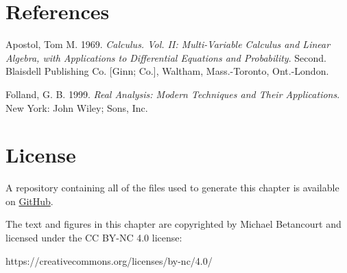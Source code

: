 \documentclass[
  letterpaper,
  DIV=11,
  numbers=noendperiod]{scrartcl}
\newlength{\cslhangindent}
\newlength{\cslentryspacingunit} %
\newenvironment{CSLReferences}[2] %
 {%
  \setlength{\parindent}{0pt}
  \ifodd #1
  \let\oldpar\par
  \def\par{\hangindent=\cslhangindent\oldpar}
  \fi
  \setlength{\parskip}{#2\cslentryspacingunit}
 }%
 {}
\begin{document}
\hypertarget{references}{%
\section*{References}\label{references}}

\hypertarget{refs}{}
\begin{CSLReferences}{1}{0}
\leavevmode{}%
Apostol, Tom M. 1969. \emph{Calculus. {V}ol. {II}: {M}ulti-Variable
Calculus and Linear Algebra, with Applications to Differential Equations
and Probability}. Second. Blaisdell Publishing Co. {[}Ginn; Co.{]},
Waltham, Mass.-Toronto, Ont.-London.

\leavevmode{}%
Folland, G. B. 1999. \emph{Real Analysis: Modern Techniques and Their
Applications}. New York: John Wiley; Sons, Inc.

\end{CSLReferences}

\hypertarget{license}{%
\section*{License}\label{license}}

A repository containing all of the files used to generate this chapter
is available on
\href{https://github.com/betanalpha/quarto_chapters/tree/main/7_transforming_probability_spaces}{GitHub}.

The text and figures in this chapter are copyrighted by Michael
Betancourt and licensed under the CC BY-NC 4.0 license:

https://creativecommons.org/licenses/by-nc/4.0/
\end{document}
